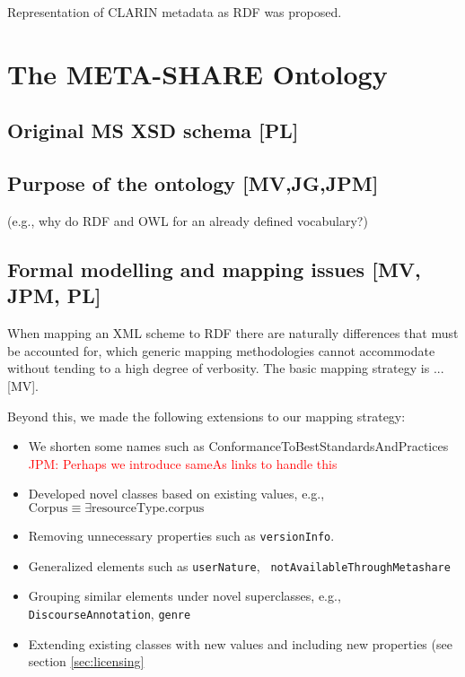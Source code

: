 \documentclass{llncs}
\begin{document}
Representation of CLARIN metadata as RDF was proposed\cite{durco2014clarin}.

\section{The META-SHARE Ontology}
\label{sec:ontology}

\subsection{Original MS XSD schema [PL]}
\label{sec:xsd}

\subsection{Purpose of the ontology [MV,JG,JPM]}
\label{sec:purpose}
(e.g., why do RDF and OWL for an already defined vocabulary?) 
\subsection{Formal modelling and mapping issues [MV, JPM, PL]}

When mapping an XML scheme to RDF there are naturally differences that must be
accounted for, which generic mapping methodologies cannot accommodate without
tending to a high degree of verbosity. The basic mapping strategy is ... [MV]. 

Beyond this, we made the following extensions to our mapping strategy:

\begin{itemize}
    \item We shorten some names such as ConformanceToBestStandardsAndPractices
        \textcolor{red}{JPM: Perhaps we introduce sameAs links to handle this}
    \item Developed novel classes based on existing values, e.g.,
        $\mathrm{Corpus} \equiv \exists \mathrm{resourceType}.\mathrm{corpus}$
    \item Removing unnecessary properties such as {\tt versionInfo}.
    \item Generalized elements such as {\tt userNature}, {\tt
        notAvailableThroughMetashare}
    \item Grouping similar elements under novel superclasses, e.g., {\tt
        DiscourseAnnotation}, {\tt genre}
    \item Extending existing classes with new values and including new
        properties (see section \ref{sec:licensing}
\end{itemize}
\end{document}
